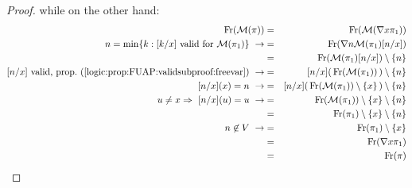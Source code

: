 \begin{proof}
while on the other hand:
    \begin{eqnarray*}
    \mbox{\rm Fr}({\cal M}(\pi))&=&\mbox{\rm Fr}({\cal M}(\mbox{$\nabla$} x\pi_{1}))\\
    n=\min\{k:[k/x]\mbox{\ valid for\ }{\cal M}(\pi_{1})\}\
    \rightarrow&=&\mbox{\rm Fr}(\mbox{$\nabla$} n{\cal M}(\pi_{1})[n/x])\\
    &=&\mbox{\rm Fr}({\cal M}(\pi_{1})[n/x])\setminus\{n\}\\
    \mbox{$[n/x]$ valid, prop.~(\ref{logic:prop:FUAP:validsubproof:freevar})}
    \ \rightarrow
    &=&[n/x](\,\mbox{\rm Fr}({\cal M}(\pi_{1}))\,)\setminus\{n\}\\
    \mbox{$[n/x](x)=n$}\ \rightarrow
    &=&[n/x](\,\mbox{\rm Fr}({\cal
    M}(\pi_{1}))\setminus\{x\}\,)\setminus\{n\}\\
    u\neq x\Rightarrow\ [n/x](u)=u\ \rightarrow
    &=&\mbox{\rm Fr}({\cal M}(\pi_{1}))\setminus\{x\}\setminus\{n\}\\
    &=&\mbox{\rm Fr}(\pi_{1})\setminus\{x\}\setminus\{n\}\\
    n\not\in V\ \rightarrow
    &=&\mbox{\rm Fr}(\pi_{1})\setminus\{x\}\\
    &=&\mbox{\rm Fr}(\mbox{$\nabla$} x\pi_{1})\\
    &=&\mbox{\rm Fr}(\pi)
    \end{eqnarray*}
\end{proof}

